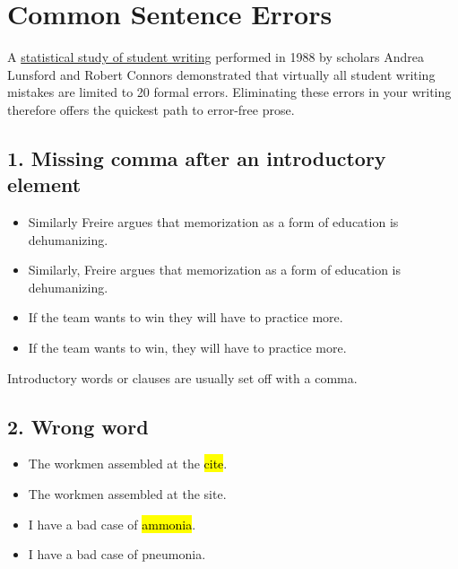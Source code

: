 


\chapter{Common Sentence Errors}
\hypertarget{Top20}{}



A \href{http://www.jstor.org/stable/357695}{statistical study of student writing} performed in 1988 by scholars Andrea Lunsford and Robert Connors demonstrated that virtually all student
writing mistakes are limited to 20 formal errors. Eliminating these 
errors in your writing therefore offers the quickest path to error-free prose.

\setcounter{secnumdepth}{0}

\section{1. Missing comma after an introductory element}


\begin{itemize}
\item Similarly Freire argues that memorization as a form of education is dehumanizing. 
\item Similarly, Freire argues that memorization as a form of education is dehumanizing. 
\medskip
\item If the team wants to win they will have to practice more. 
\item If the team wants to win, they will have to practice more. 
\end{itemize}

\noindent Introductory words or clauses are usually set off with a comma.


\section{2. Wrong word} 
\begin{itemize}
\item The workmen assembled at the \hl{cite}. 

\item The workmen assembled at the site. 
\medskip
\item I have a bad case of \hl{ammonia}. 

\item I have a bad case of pneumonia. 
\end{itemize}



